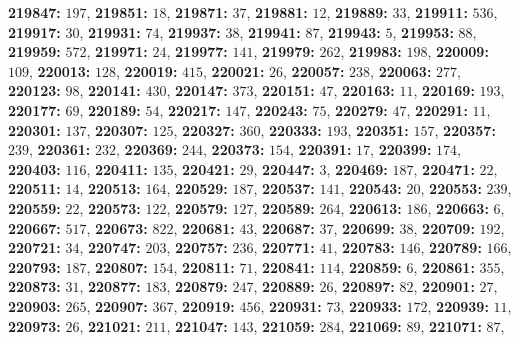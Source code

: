\textsf{\bfseries 219847:} $197$, \textsf{\bfseries 219851:} $18$, \textsf{\bfseries 219871:} $37$, \textsf{\bfseries 219881:} $12$, \textsf{\bfseries 219889:} $33$, \textsf{\bfseries 219911:} $536$, \textsf{\bfseries 219917:} $30$, \textsf{\bfseries 219931:} $74$, \textsf{\bfseries 219937:} $38$, \textsf{\bfseries 219941:} $87$, \textsf{\bfseries 219943:} $5$, \textsf{\bfseries 219953:} $88$, \textsf{\bfseries 219959:} $572$, \textsf{\bfseries 219971:} $24$, \textsf{\bfseries 219977:} $141$, \textsf{\bfseries 219979:} $262$, \textsf{\bfseries 219983:} $198$, \textsf{\bfseries 220009:} $109$, \textsf{\bfseries 220013:} $128$, \textsf{\bfseries 220019:} $415$, \textsf{\bfseries 220021:} $26$, \textsf{\bfseries 220057:} $238$, \textsf{\bfseries 220063:} $277$, \textsf{\bfseries 220123:} $98$, \textsf{\bfseries 220141:} $430$, \textsf{\bfseries 220147:} $373$, \textsf{\bfseries 220151:} $47$, \textsf{\bfseries 220163:} $11$, \textsf{\bfseries 220169:} $193$, \textsf{\bfseries 220177:} $69$, \textsf{\bfseries 220189:} $54$, \textsf{\bfseries 220217:} $147$, \textsf{\bfseries 220243:} $75$, \textsf{\bfseries 220279:} $47$, \textsf{\bfseries 220291:} $11$, \textsf{\bfseries 220301:} $137$, \textsf{\bfseries 220307:} $125$, \textsf{\bfseries 220327:} $360$, \textsf{\bfseries 220333:} $193$, \textsf{\bfseries 220351:} $157$, \textsf{\bfseries 220357:} $239$, \textsf{\bfseries 220361:} $232$, \textsf{\bfseries 220369:} $244$, \textsf{\bfseries 220373:} $154$, \textsf{\bfseries 220391:} $17$, \textsf{\bfseries 220399:} $174$, \textsf{\bfseries 220403:} $116$, \textsf{\bfseries 220411:} $135$, \textsf{\bfseries 220421:} $29$, \textsf{\bfseries 220447:} $3$, \textsf{\bfseries 220469:} $187$, \textsf{\bfseries 220471:} $22$, \textsf{\bfseries 220511:} $14$, \textsf{\bfseries 220513:} $164$, \textsf{\bfseries 220529:} $187$, \textsf{\bfseries 220537:} $141$, \textsf{\bfseries 220543:} $20$, \textsf{\bfseries 220553:} $239$, \textsf{\bfseries 220559:} $22$, \textsf{\bfseries 220573:} $122$, \textsf{\bfseries 220579:} $127$, \textsf{\bfseries 220589:} $264$, \textsf{\bfseries 220613:} $186$, \textsf{\bfseries 220663:} $6$, \textsf{\bfseries 220667:} $517$, \textsf{\bfseries 220673:} $822$, \textsf{\bfseries 220681:} $43$, \textsf{\bfseries 220687:} $37$, \textsf{\bfseries 220699:} $38$, \textsf{\bfseries 220709:} $192$, \textsf{\bfseries 220721:} $34$, \textsf{\bfseries 220747:} $203$, \textsf{\bfseries 220757:} $236$, \textsf{\bfseries 220771:} $41$, \textsf{\bfseries 220783:} $146$, \textsf{\bfseries 220789:} $166$, \textsf{\bfseries 220793:} $187$, \textsf{\bfseries 220807:} $154$, \textsf{\bfseries 220811:} $71$, \textsf{\bfseries 220841:} $114$, \textsf{\bfseries 220859:} $6$, \textsf{\bfseries 220861:} $355$, \textsf{\bfseries 220873:} $31$, \textsf{\bfseries 220877:} $183$, \textsf{\bfseries 220879:} $247$, \textsf{\bfseries 220889:} $26$, \textsf{\bfseries 220897:} $82$, \textsf{\bfseries 220901:} $27$, \textsf{\bfseries 220903:} $265$, \textsf{\bfseries 220907:} $367$, \textsf{\bfseries 220919:} $456$, \textsf{\bfseries 220931:} $73$, \textsf{\bfseries 220933:} $172$, \textsf{\bfseries 220939:} $11$, \textsf{\bfseries 220973:} $26$, \textsf{\bfseries 221021:} $211$, \textsf{\bfseries 221047:} $143$, \textsf{\bfseries 221059:} $284$, \textsf{\bfseries 221069:} $89$, \textsf{\bfseries 221071:} $87$, 
